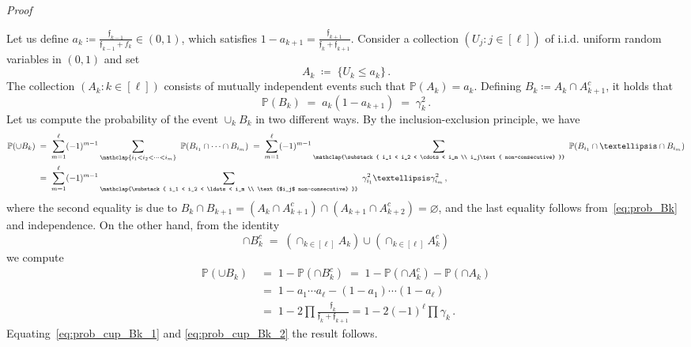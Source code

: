 \documentclass[reqno,a4paper,11pt]{amsart}
\makeatletter
\theoremstyle{remark}
\newcommand{\mf}[1]{{\mathfrak #1}}
\newcommand{\bb}[1]{{\mathbb #1}}
\newcommand{\f}{{\mf f}}
\numberwithin{equation}{section}
\renewenvironment{proof}[1][Proof]{\par
\pushQED{\qed}%
\normalfont \topsep6\p@\@plus6\p@\relax
\trivlist
\item\relax
{\itshape
#1\@addpunct{.}}\hspace\labelsep\ignorespaces
}{%
\popQED\endtrivlist\@endpefalse
}
\makeatother
\begin{document}
\begin{proof}
Let us define $a_k \coloneqq \frac{\f_{k-1}}{\f_{k-1}+f_k} \in (0,1)$, which satisfies
$1 - a_{k+1} = \frac{\f_{k+1}}{\f_{k}+\f_{k+1}}$. Consider a collection
$(U_j: j \in [\ell])$ of i.i.d. uniform random variables in $(0,1)$ and set
\begin{equation}
\label{eq:def_event_Ak}
    A_k \;\coloneqq\; \{U_k \le a_k\}\,.
\end{equation}
The collection $(A_k: k \in [\ell])$ consists of mutually independent events such that $\bb P(A_k) = a_k$.  Defining $B_k \coloneqq A_k \cap A_{k+1}^{c}$, it holds that
\begin{equation}
\label{eq:prob_Bk}
\bb P(B_k)\; = \; a_k (1 - a_{k+1}) \;=\; \gamma_k^2\,.
\end{equation}
%
Let us compute the probability of the event $\cup_k B_k$ in two different ways.
By the inclusion-exclusion principle, we have
\begin{align}
\bb P(\cup B_k)
    &\;=\; \sum_{m=1}^{\ell} (-1)^{m-1} \sum_{\mathclap{i_1 < i_2 < \cdots < i_m}}
        \ \bb P(B_{i_1} \cap \cdots \cap B_{i_m}) \;=\; \sum_{m=1}^{\ell} (-1)^{m-1} \sum_{\mathclap{\substack{ i_1 < i_2 < \cdots
    < i_m \\ i_j\text{ non-consecutive} }}}
        \ \bb P(B_{i_1} \cap \ldots \cap B_{i_m}) \nonumber\\
\label{eq:prob_cup_Bk_1}
    &\;=\; \sum_{m=1}^{\ell} (-1)^{m-1} \sum_{\mathclap{\substack{ i_1 < i_2 < \ldots
    < i_m \\ \text{$i_j$ non-consecutive} }}}
        \ \gamma^2_{i_1} \ldots \gamma^2_{i_m}\,,
\end{align}
where the second equality is due to
$B_k \cap B_{k+1} = (A_k \cap A^{c}_{k+1}) \cap (A_{k+1} \cap A^{c}_{k+2}) =\varnothing$,
and the last equality follows from~\eqref{eq:prob_Bk} and independence.
On the other hand, from the identity
\begin{equation*}
    \cap B^{c}_k \;=\; (\cap_{k\in [\ell]} A_k) \cup (\cap_{k\in [\ell]} A^c_k)
\end{equation*}
we compute
\begin{align}
\bb P(\cup B_k)
    &\;=\; 1 - \bb P(\cap B^c_k)
    \;=\; 1 - \bb P(\cap A^c_k) -  \bb P(\cap A_k)\nonumber\\
    &\;=\; 1 - a_1 \cdots a_\ell - (1 - a_1) \cdots (1 - a_\ell) \nonumber\\
    &\;=\; 1 - 2 \prod \frac{\f_k}{\f_k + \f_{k+1}}     = 1 - 2 (-1)^\ell \prod \gamma_k\,.\label{eq:prob_cup_Bk_2}
\end{align}
Equating~\eqref{eq:prob_cup_Bk_1} and \eqref{eq:prob_cup_Bk_2} the result
follows.
\end{proof}
\end{document}
